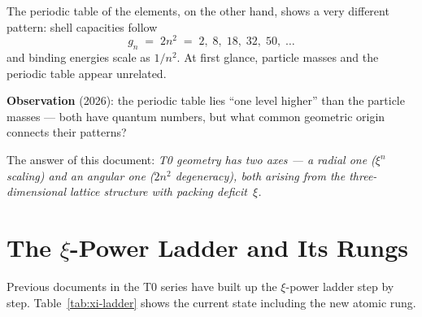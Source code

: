 The periodic table of the elements, on the other hand, shows a very different
pattern: shell capacities follow
\begin{equation}
  g_n \;=\; 2n^2 \;=\; 2,\; 8,\; 18,\; 32,\; 50,\;\ldots
  \label{eq:shells}
\end{equation}
and binding energies scale as $1/n^2$.
At first glance, particle masses and the periodic table appear unrelated.

\textbf{Observation} (2026): the periodic table lies ``one level
higher'' than the particle masses — both have quantum numbers, but what
common geometric origin connects their patterns?

The answer of this document: \emph{T0 geometry has two axes —
a radial one ($\xi^n$ scaling) and an angular one ($2n^2$ degeneracy),
both arising from the three-dimensional lattice structure with packing deficit~$\xi$.}

\section{The \texorpdfstring{$\xi$}{xi}-Power Ladder and Its Rungs}
\label{sec:xi-ladder}

Previous documents in the T0 series have built up the $\xi$-power ladder
step by step. Table~\ref{tab:xi-ladder} shows the current state including
the new atomic rung.

\begin{table}[htbp]
\centering
\caption{Complete $\xi$-power ladder (as of March 2026)}
\label{tab:xi-ladder}
\end{table}

